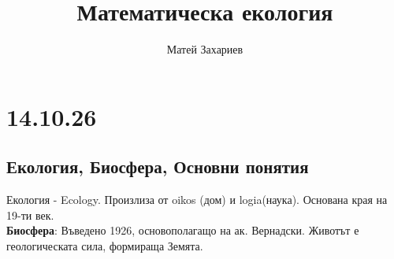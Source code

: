 \documentclass[12pt, a4paper]{article}
\title{Математическа екология}
\author{Матей Захариев}
\date{}
\begin{document}
\maketitle

{\centering\section*{14.10.26}}
\subsection*{Екология, Биосфера, Основни понятия}
Екология - Ecology. Произлиза от oikos (дом) и logia(наука). Основана края на 19-ти век.\\

\textbf{Биосфера}: Въведено 1926, основополагащо на ак. Вернадски. Животът е геологическата сила, формираща Земята.\\
\end{document}
